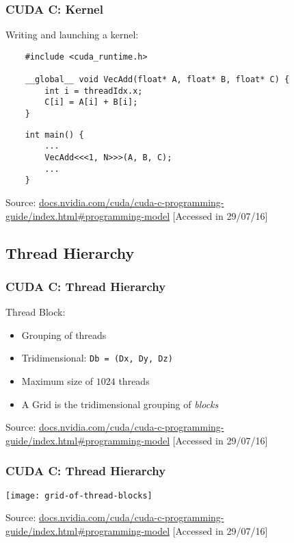 \documentclass[10pt, compress]{beamer}
\begin{document}
\begin{frame}[fragile]
    \frametitle{CUDA C: Kernel}
    Writing and \alert{launching} a \alert{kernel}:
    \begin{lstlisting}
    #include <cuda_runtime.h>

    __global__ void VecAdd(float* A, float* B, float* C) {
        int i = threadIdx.x;
        C[i] = A[i] + B[i];
    }
    \end{lstlisting}

    \begin{lstlisting}
    int main() {
        ...
        VecAdd<<<1, N>>>(A, B, C);
        ...
    }
    \end{lstlisting}
    \vfill

    \begin{center}
        \tiny{Source: \url{docs.nvidia.com/cuda/cuda-c-programming-guide/index.html\#programming-model} [Accessed in 29/07/16]}
    \end{center}
\end{frame}

\subsection{Thread Hierarchy}

\begin{frame}
    \frametitle{CUDA C: Thread Hierarchy}
    \alert{Thread Block}:
    \begin{itemize}
        \item Grouping of threads

        \item \alert{Tridimensional}: \texttt{\footnotesize{Db = (Dx, Dy, Dz)}}

        \item \alert{Maximum size} of $1024$ threads

        \item A \alert{Grid} is the tridimensional grouping of \textit{blocks}
    \end{itemize}

    \vfill

    \begin{center}
        \tiny{Source: \url{docs.nvidia.com/cuda/cuda-c-programming-guide/index.html\#programming-model} [Accessed in 29/07/16]}
    \end{center}
\end{frame}

\begin{frame}
    \frametitle{CUDA C: Thread Hierarchy}
    \centering
    \texttt{[image: grid-of-thread-blocks]}

    \tiny{Source: \url{docs.nvidia.com/cuda/cuda-c-programming-guide/index.html\#programming-model} [Accessed in 29/07/16]}
\end{frame}
\end{document}
